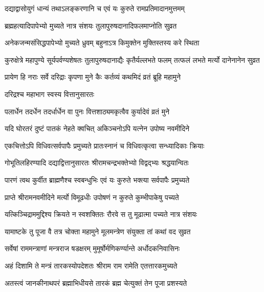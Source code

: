\twolineshloka
{दद्याद्वासोयुगं धान्यं तथाऽलङ्करणानि च}
{एवं यः कुरुते रामप्रतिमादानमुत्तमम्}%

\twolineshloka
{ब्रह्महत्यादिपापेभ्यो मुच्यते नात्र संशयः}
{तुलापुरुषदानादिफलमाप्नोति सुव्रत}%

\twolineshloka
{अनेकजन्मसंसिद्धपापेभ्यो मुच्यते ध्रुवम्}
{बहुनाऽत्र किमुक्तेन मुक्तिस्तस्य करे स्थिता}%

\threelineshloka
{कुरुक्षेत्रे महापुण्ये सूर्यपर्वण्यशेषतः}
{तुलापुरुषदानाद्यैः कृतैर्यल्लभते फलम्}
{तत्फलं लभते मर्त्यो दानेनानेन सुव्रत}%

\twolineshloka
{प्रायेण हि नराः सर्वे दरिद्राः कृपणा मुने}
{कैः कर्तव्यं कथमिदं व्रतं ब्रूहि महामुने}%

\onelineshloka
{दरिद्रश्च महाभाग स्वस्य वित्तानुसारतः}%

\twolineshloka
{पलार्धेन तदर्धेन तदर्धार्धेन वा पुनः}
{वित्तशाठ्यमकृत्वैव कुर्यादेवं व्रतं मुने}%

\twolineshloka
{यदि घोरतरं दुष्टं पातकं नेहते क्वचित्}
{अकिञ्चनोऽपि यत्नेन उपोष्य नवमीदिने}%

\twolineshloka
{एकचित्तोऽपि विधिवत्सर्वपापैः प्रमुच्यते}
{प्रातःस्नानं च विधिवत्कृत्वा सन्ध्यादिकाः क्रियाः}%

\twolineshloka
{गोभूतिलहिरण्यादि दद्याद्वित्तानुसारतः}
{श्रीरामचन्द्रभक्तेभ्यो विद्वद्भ्यः श्रद्धयान्वितः}%

\twolineshloka
{पारणं त्वथ कुर्वीत ब्राह्मणैश्च स्वबन्धुभिः}
{एवं यः कुरुते भक्त्या सर्वपापैः प्रमुच्यते}%

\twolineshloka
{प्राप्ते श्रीरामनवमीदिने मर्त्यो विमूढधीः}
{उपोषणं न कुरुते कुम्भीपाकेषु पच्यते}%

\twolineshloka
{यत्किञ्चिद्राममुद्दिश्य क्रियते न स्वशक्तितः}
{रौरवे स तु मूढात्मा पच्यते नात्र संशयः}%

\twolineshloka
{यामाष्टके तु पूजा वै तत्र चोक्ता महामुने}
{मूलमन्त्रेण संयुक्ता तां कथां वद सुव्रत}%

\twolineshloka
{सर्वेषां राममन्त्राणां मन्त्रराज षडक्षरम्} %
{मुमूर्षोर्मणिकर्ण्यान्ते अर्धोदकनिवासिनः}%

\twolineshloka
{अहं दिशामि ते मन्त्रं तारकस्योपदेशतः}
{श्रीराम राम रामेति एतत्तारकमुच्यते}%

\twolineshloka
{अतस्त्वं जानकीनाथपरं ब्रह्माभिधीयसे}
{तारकं ब्रह्म चेत्युक्तं तेन पूजा प्रशस्यते}%

